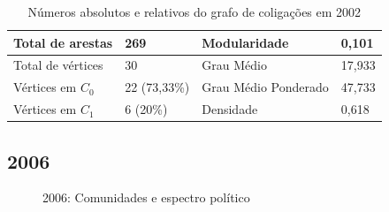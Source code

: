 \begin{table}[H]
\centering
\label{table-2002}
\begin{tabular}{|l|l|l|l|}
\hline
Total de arestas  & 269 & Modularidade         & 0,101 \\ \hline
Total de vértices & 30  & Grau Médio           & 17,933 \\ \hline
Vértices em $C_0$    & 22  (73,33\%) & Grau Médio Ponderado & 47,733 \\ \hline
Vértices em $C_1$    & 6 (20\%) & Densidade            &  0,618\\ \hline
\end{tabular}
\caption{Números absolutos e relativos do grafo de coligações em 2002}
\end{table}

\subsection{2006}
\label{resultados__grafos--2006}

\begin{figure}[H]
\center
    \qquad
    
    \caption{2006: Comunidades e espectro político}
\end{figure}


